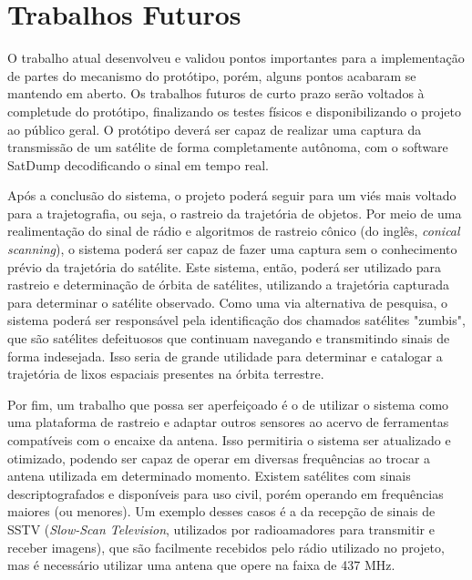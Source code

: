 \section*{Trabalhos Futuros}

O trabalho atual desenvolveu e validou pontos importantes para a implementação de partes do mecanismo do protótipo, porém, alguns pontos acabaram se mantendo em aberto.
Os trabalhos futuros de curto prazo serão voltados à completude do protótipo, finalizando os testes físicos e disponibilizando o projeto ao público geral.
O protótipo deverá ser capaz de realizar uma captura da transmissão de um satélite de forma completamente autônoma, com o software SatDump decodificando o sinal em tempo real.

Após a conclusão do sistema, o projeto poderá seguir para um viés mais voltado para a trajetografia, ou seja, o rastreio da trajetória de objetos.
Por meio de uma realimentação do sinal de rádio e algoritmos de rastreio cônico (do inglês, \textit{conical scanning}), o sistema poderá ser capaz de fazer uma captura sem o conhecimento prévio da trajetória do satélite.
Este sistema, então, poderá ser utilizado para rastreio e determinação de órbita de satélites, utilizando a trajetória capturada para determinar o satélite observado.
Como uma via alternativa de pesquisa, o sistema poderá ser responsável pela identificação dos chamados satélites "zumbis", que são satélites defeituosos que continuam navegando e transmitindo sinais de forma indesejada.
Isso seria de grande utilidade para determinar e catalogar a trajetória de lixos espaciais presentes na órbita terrestre.

Por fim, um trabalho que possa ser aperfeiçoado é o de utilizar o sistema como uma plataforma de rastreio e adaptar outros sensores ao acervo de ferramentas compatíveis com o encaixe da antena.
Isso permitiria o sistema ser atualizado e otimizado, podendo ser capaz de operar em diversas frequências ao trocar a antena utilizada em determinado momento. Existem satélites com sinais descriptografados e disponíveis para uso civil, porém operando em frequências maiores (ou menores).
Um exemplo desses casos é a da recepção de sinais de SSTV (\textit{Slow-Scan Television}, utilizados por radioamadores para transmitir e receber imagens), que são  facilmente recebidos pelo rádio utilizado no projeto, mas é necessário utilizar uma antena que opere na faixa de 437 MHz.

